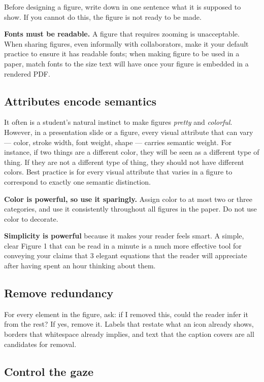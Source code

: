 \documentclass[11pt, letterpaper]{article}
\begin{document}
Before designing a figure, write down in one sentence what it is supposed to 
show. If you cannot do this, the figure is not ready to be made. 

\textbf{Fonts must be readable.} A figure that requires zooming is unacceptable.  When sharing figures, even informally with collaborators, 
make it your default practice to ensure it has readable fonts; 
when making figure to be used in a paper, match fonts to the size text will have once your figure is embedded in a rendered PDF.

\subsection{Attributes encode semantics}

It often is a student's natural instinct to make figures \textit{pretty} and \textit{colorful}. However, in a presentation slide or a figure, every visual attribute that can vary --- color, stroke width, font weight, shape --- carries semantic weight. For instance, if two things are a different color, they will be seen as a different type of thing. If they are not a different type of thing, they should not have different colors. Best practice is for every visual attribute that varies in a figure to correspond to exactly one semantic distinction.

\textbf{Color is powerful, so use it sparingly.} Assign color to at most 
two or three categories, and use it consistently throughout all figures in 
the paper. Do not use color to decorate. 

\textbf{Simplicity is powerful} because it makes your reader feels smart. A simple, clear Figure 1 that can be read in a minute is a much more effective tool for conveying your claims that 3 elegant equations that the reader will appreciate after having spent an hour thinking about them.


\subsection{Remove redundancy}

For every element in the figure, ask: if I removed this, could the reader 
infer it from the rest? If yes, remove it. Labels that restate what an icon 
already shows, borders that whitespace already implies, and text that the 
caption covers are all candidates for removal.

\subsection{Control the gaze}
\end{document}
